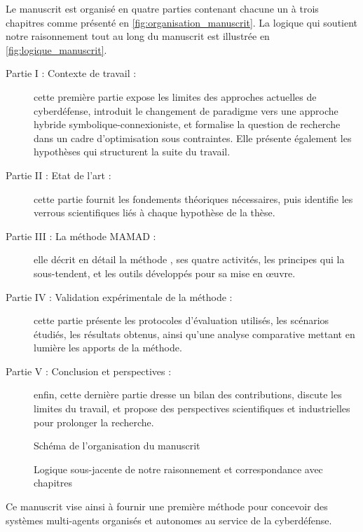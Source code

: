 Le manuscrit est organisé en quatre parties contenant chacune un à trois chapitres comme présenté en \autoref{fig:organisation_manuscrit}. La logique qui soutient notre raisonnement tout au long du manuscrit est illustrée en \autoref{fig:logique_manuscrit}.
%
\begin{description}
    \item[Partie I : Contexte de travail :] cette première partie expose les limites des approches actuelles de cyberdéfense, introduit le changement de paradigme vers une approche hybride symbolique-connexioniste, et formalise la question de recherche dans un cadre d'optimisation sous contraintes. Elle présente également les hypothèses qui structurent la suite du travail.

    \item[Partie II : Etat de l'art :] cette partie fournit les fondements théoriques nécessaires, puis identifie les verrous scientifiques liés à chaque hypothèse de la thèse.

    \item[Partie III : La méthode MAMAD :] elle décrit en détail la méthode , ses quatre activités, les principes qui la sous-tendent, et les outils développés pour sa mise en œuvre.

    \item[Partie IV : Validation expérimentale de la méthode :] cette partie présente les protocoles d'évaluation utilisés, les scénarios étudiés, les résultats obtenus, ainsi qu'une analyse comparative mettant en lumière les apports de la méthode.

    \item[Partie V : Conclusion et perspectives :] enfin, cette dernière partie dresse un bilan des contributions, discute les limites du travail, et propose des perspectives scientifiques et industrielles pour prolonger la recherche.
\end{description}
%
\vspace{1em}
%
\begin{figure}[h!]
    \centering
    \resizebox{\textwidth}{!}{%
        
    }
    \caption{Schéma de l'organisation du manuscrit}
    \label{fig:organisation_manuscrit}
\end{figure}
%
\vspace{1em}
%
\begin{figure}[h!]
    \centering
    \resizebox{\textwidth}{!}{%
        
    }
    \caption{Logique sous-jacente de notre raisonnement et correspondance avec chapitres}
    \label{fig:logique_manuscrit}
\end{figure}

Ce manuscrit vise ainsi à fournir une première méthode pour concevoir des systèmes multi-agents organisés et autonomes au service de la cyberdéfense.

\cleardoublepage
